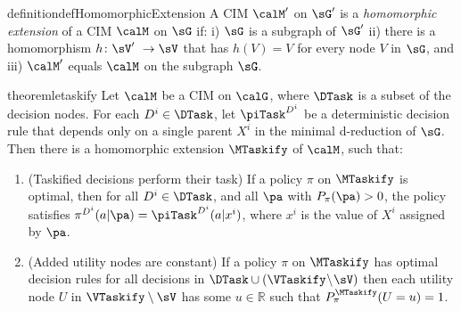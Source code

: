 





\begin{restatable}{definition}{defHomomorphicExtension}\label{le:21-may-19-Homomorphic-extension}
A CIM $\calM'$ on $\sG'$ is a \emph{homomorphic extension} of 
a CIM $\calM$ on $\sG$ if:
    i) $\sG$ is a subgraph of $\sG'$
    ii) there is a homomorphism $h\colon \sV'\ \to \sV$ 
    that has $h(V)=V$ for every node $V$ in $\sG$, and
    iii) $\calM'$ equals $\calM$ on the subgraph $\sG$.
\end{restatable}




\newcommand{\TaskifySublemmaPerformsTheirTaskName}{Taskified decisions perform their task}
\newcommand{\TaskifySublemmaAddedUtilityNodesName}{Added utility nodes are constant}

\begin{restatable}[Taskify]{theorem}{letaskify}
\label{le:21jan31.3-multi-Taskify-lemma}
Let $\calM$ be a CIM on $\calG$, where $\DTask$ is a subset of the decision nodes. 
For each $D^i \in \DTask$, let $\piTask^{D^i}$ be a deterministic decision rule that depends only on a single parent $X^i$ in the minimal d-reduction of $\sG$. Then there is a homomorphic extension $\MTaskify$ of $\calM$, such that:~
\begin{enumerate}[label=(\alph*)]
    \item \label{le:21jan31.3a-taskify-optimal-iff-performs-task} 
    (\TaskifySublemmaPerformsTheirTaskName)
    If a policy $\pi$ on $\MTaskify$ is optimal, then for all $D^i \in \DTask$, and all $\pa$ with $P_\pi(\pa) > 0$, the policy satisfies $\pi^{D^i}(a | \pa) = \piTask^{D^i} (a | x^i)$, where $x^i$ is the value of $X^i$ assigned by $\pa$.
    
    \item \label{le:21jan31.3c-taskify-added-utility-nodes-unaffected}
    (\TaskifySublemmaAddedUtilityNodesName)
    If a policy $\pi$ on $\MTaskify$ has optimal decision rules for all decisions in $\DTask \cup (\VTaskify \!\setminus \!\sV)$ then each utility node $U$ in $\VTaskify\setminus \sV$ has some $u \in \mathbb{R}$ such that $P^{\MTaskify}_{\pi}(U=u)=1$.
\end{enumerate}    




\end{restatable}
